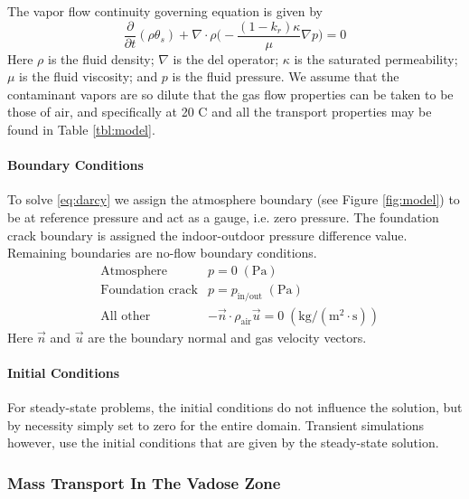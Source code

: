 The vapor flow continuity governing equation is given by
\begin{equation}\label{eq:darcy}
  \frac{\partial}{\partial t} (\rho \theta_s) + \nabla \cdot \rho \Big( -\frac{(1-k_r) \kappa}{\mu} \nabla p \Big) = 0
\end{equation}
Here $\rho$ is the fluid density;
$\nabla$ is the del operator;
$\kappa$ is the saturated permeability;
$\mu$ is the fluid viscosity; and $p$ is the fluid pressure.
We assume that the contaminant vapors are so dilute that the gas flow properties can be taken to be those of air, and specifically at 20 \degree C and all the transport properties may be found in Table \ref{tbl:model}.\par

\paragraph{Boundary Conditions}

To solve \eqref{eq:darcy} we assign the atmosphere boundary (see Figure \ref{fig:model}) to be at reference pressure and act as a gauge, i.e. zero pressure.
The foundation crack boundary is assigned the indoor-outdoor pressure difference value.
Remaining boundaries are no-flow boundary conditions.
\begin{align}
  &\text{Atmosphere} &p = 0 \; \mathrm{(Pa)} \\
  &\text{Foundation crack} &p = p_\mathrm{in/out} \; \mathrm{(Pa)} \\
  &\text{All other} &-\vec{n}\cdot\rho_\mathrm{air}\vec{u} = 0 \; \mathrm{(kg/(m^2\cdot s))}
\end{align}
Here $\vec{n}$ and $\vec{u}$ are the boundary normal and gas velocity vectors.

\paragraph{Initial Conditions}

For steady-state problems, the initial conditions do not influence the solution, but by necessity simply set to zero for the entire domain.
Transient simulations however, use the initial conditions that are given by the steady-state solution.\par

\subsubsection{Mass Transport In The Vadose Zone}\label{sec:mass_transport}

